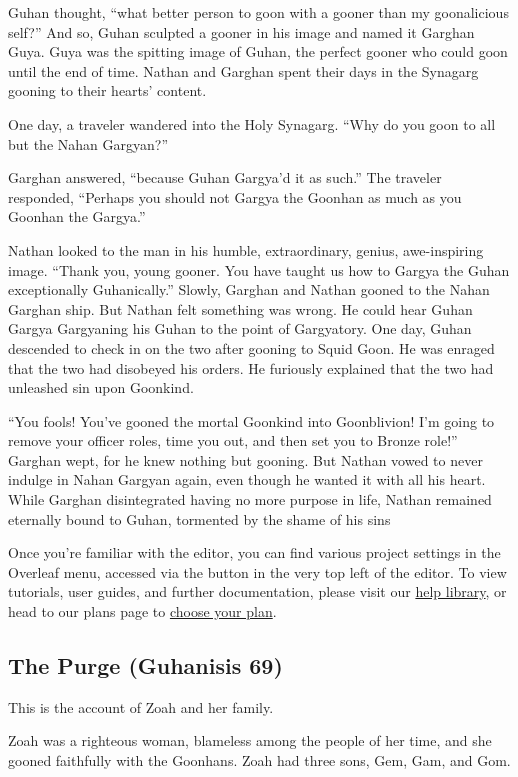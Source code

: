 \documentclass{article}
\begin{document}
Guhan thought, “what better person to goon with a gooner than my goonalicious self?” And so, Guhan sculpted a gooner in his image and named it Garghan Guya. Guya was the spitting image of Guhan, the perfect gooner who could goon until the end of time. Nathan and Garghan spent their days in the Synagarg gooning to their hearts' content.

One day, a traveler wandered into the Holy Synagarg. “Why do you goon to all but the Nahan Gargyan?”

Garghan answered, “because Guhan Gargya'd it as such.”
The traveler responded, “Perhaps you should not Gargya the Goonhan as much as you Goonhan the Gargya.”

Nathan looked to the man in his humble, extraordinary, genius, awe-inspiring image. “Thank you, young gooner. You have taught us how to Gargya the Guhan exceptionally Guhanically.”
Slowly, Garghan and Nathan gooned to the Nahan Garghan ship. But Nathan felt something was wrong. He could hear Guhan Gargya Gargyaning his Guhan to the point of Gargyatory.
One day, Guhan descended to check in on the two after gooning to Squid Goon. He was enraged that the two had disobeyed his orders. He furiously explained that the two had unleashed sin upon Goonkind.

“You fools! You've gooned the mortal Goonkind into Goonblivion! I'm going to remove your officer roles, time you out, and then set you to Bronze role!”
Garghan wept, for he knew nothing but gooning. But Nathan vowed to never indulge in Nahan Gargyan again, even though he wanted it with all his heart. While Garghan disintegrated having no more purpose in life, Nathan remained eternally bound to Guhan, tormented by the shame of his sins



Once you're familiar with the editor, you can find various project settings in the Overleaf menu, accessed via the button in the very top left of the editor. To view tutorials, user guides, and further documentation, please visit our \href{https://www.overleaf.com/learn}{help library}, or head to our plans page to \href{https://www.overleaf.com/user/subscription/plans}{choose your plan}.

\subsection{The Purge (Guhanisis 69)}

This is the account of Zoah and her family.

Zoah was a righteous woman, blameless among the people of her time, and she gooned faithfully with the Goonhans. Zoah had three sons, Gem, Gam, and Gom. 
\end{document}
